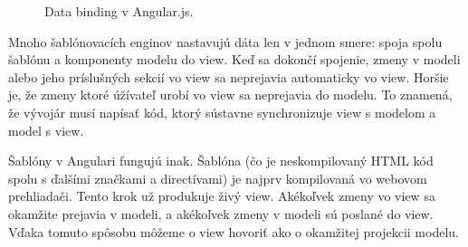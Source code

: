 \begin{figure}[H]
\caption{Data binding v Angular.js.}
\end{figure}

Mnoho šablónovacích enginov nastavujú dáta len v jednom smere: spoja spolu šablónu a komponenty modelu do view. Keď sa dokončí spojenie, zmeny v modeli alebo jeho príslušných sekcií vo view sa neprejavia automaticky vo view. Horšie je, že zmeny ktoré úžívateľ urobí vo view sa neprejavia do modelu. To znamená, že vývojár musí napísať kód, ktorý sústavne synchronizuje view s modelom a model s view.

Šablóny v Angulari fungujú inak. Šablóna (čo je neskompilovaný HTML kód spolu s ďalšími značkami a directívami) je najprv kompilovaná vo webovom prehliadači. Tento krok už produkuje živý view. Akékoľvek zmeny vo view sa okamžite prejavia v modeli, a akékoľvek zmeny v modeli sú poslané do view. Vďaka tomuto spôsobu môžeme o view hovoriť ako o okamžitej projekcii modelu.

